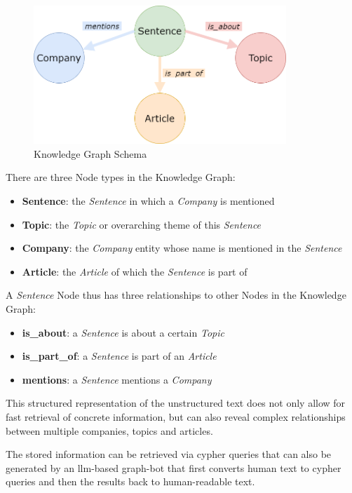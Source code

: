 \begin{figure}[H]
	\centering
	\includegraphics[width=0.85\textwidth]{Assets/kg_schema}
	\caption{Knowledge Graph Schema}
	\label{fig:kg-schema}
\end{figure}

There are three Node types in the Knowledge Graph:

\begin{itemize}
	\item \textbf{Sentence}: the \emph{Sentence} in which a \emph{Company} is mentioned
	\item \textbf{Topic}: the \emph{Topic} or overarching theme of this \emph{Sentence}
	\item \textbf{Company}: the \emph{Company} entity whose name is mentioned in the \emph{Sentence}
	\item \textbf{Article}: the \emph{Article} of which the \emph{Sentence} is part of
\end{itemize}

A \emph{Sentence} Node thus has three relationships to other Nodes in the Knowledge Graph:

\begin{itemize}
	\item \textbf{is\_about}: a \emph{Sentence} is about a certain \emph{Topic}
	\item \textbf{is\_part\_of}: a \emph{Sentence} is part of an \emph{Article}
	\item \textbf{mentions}: a \emph{Sentence} mentions a \emph{Company}
\end{itemize}

This structured representation of the unstructured text does not only allow for fast retrieval of concrete information, but can also reveal complex relationships between multiple companies, topics and articles.

The stored information can be retrieved via \gls{cypher} queries that can also be generated by an \gls{llm}-based \gls{graph-bot} that first converts human text to \gls{cypher} queries and then the results back to human-readable text.

